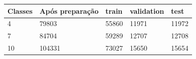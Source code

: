 \begin{tabular}{lllll}
\hline
Classes & Após preparação & train & validation & test \\
\hline
4 & 79803 & 55860 & 11971 & 11972 \\
7 & 84704 & 59289 & 12707 & 12708 \\
10 & 104331 & 73027 & 15650 & 15654 \\
\hline
\end{tabular}
